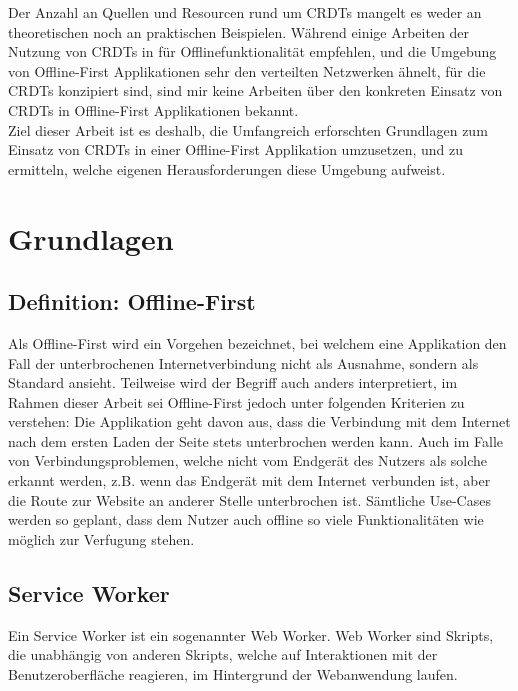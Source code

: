 \documentclass[a4paper, 12pt]{scrreprt}
\begin{document}
Der Anzahl an Quellen und Resourcen rund um CRDTs mangelt es weder an theoretischen noch an praktischen Beispielen. Während einige Arbeiten der Nutzung von CRDTs in für Offlinefunktionalität empfehlen, und die Umgebung von Offline-First Applikationen sehr den verteilten Netzwerken ähnelt, für die CRDTs konzipiert sind, sind mir keine Arbeiten über den konkreten Einsatz von CRDTs in Offline-First Applikationen bekannt.\\

Ziel dieser Arbeit ist es deshalb, die Umfangreich erforschten Grundlagen zum Einsatz von CRDTs in einer Offline-First Applikation umzusetzen, und zu ermitteln, welche eigenen Herausforderungen diese Umgebung aufweist.
\chapter{Grundlagen}
\section{Definition: Offline-First}
Als Offline-First wird ein Vorgehen bezeichnet, bei welchem eine Applikation den Fall der unterbrochenen Internetverbindung nicht als Ausnahme, sondern als Standard ansieht. Teilweise wird der Begriff auch anders interpretiert, im Rahmen dieser Arbeit sei Offline-First jedoch unter folgenden Kriterien zu verstehen: Die Applikation geht davon aus, dass die Verbindung mit dem Internet nach dem ersten Laden der Seite stets unterbrochen werden kann. Auch im Falle von Verbindungsproblemen, welche nicht vom Endgerät des Nutzers als solche erkannt werden, z.B. wenn das Endgerät mit dem Internet verbunden ist, aber die Route zur Website an anderer Stelle unterbrochen ist. Sämtliche Use-Cases werden so geplant, dass dem Nutzer auch offline so viele Funktionalitäten wie möglich zur Verfugung stehen.



\section{Service Worker}

Ein Service Worker ist ein sogenannter Web Worker. Web Worker sind Skripts, die unabhängig von anderen Skripts, welche auf Interaktionen mit der Benutzeroberfläche reagieren, im Hintergrund der Webanwendung laufen\autocite{OnlineHTTPWorker}.
\end{document}

